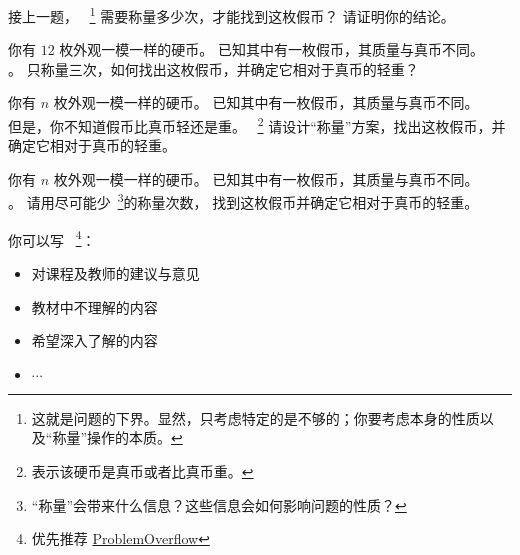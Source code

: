 \documentclass[a4paper, justified]{tufte-handout}
\begin{document}
\begin{solution}
\end{solution}

\begin{problem}[$n$ 枚硬币问题的下界]
  接上一题，
  ~\footnote{这就是问题的下界。显然，只考虑特定的是不够的；你要考虑本身的性质以及``称量''操作的本质。}
  需要称量多少次，才能找到这枚假币？
  请证明你的结论。
\end{problem}

\begin{solution}
\end{solution}

\begin{problem}
  你有 $12$ 枚外观一模一样的硬币。
  已知其中有一枚假币，其质量与真币不同。\\
  。
  只称量三次，如何找出这枚假币，并确定它相对于真币的轻重？

\end{problem}

\begin{solution}%
\end{solution}

\beginoptional

\begin{problem}[$n$ 枚硬币]
  你有 $n$ 枚外观一模一样的硬币。
  已知其中有一枚假币，其质量与真币不同。\\
  但是，你不知道假币比真币轻还是重。
  ~\footnote{表示该硬币是真币或者比真币重。} 
  请设计``称量''方案，找出这枚假币，并确定它相对于真币的轻重。
\end{problem}

\begin{solution}
\end{solution}

\beginot

\begin{problem}[$n$ 枚硬币]
  你有 $n$ 枚外观一模一样的硬币。
  已知其中有一枚假币，其质量与真币不同。\\
  。
  请用尽可能少~\footnote{``称量''会带来什么信息？这些信息会如何影响问题的性质？}的称量次数，
  找到这枚假币并确定它相对于真币的轻重。
\end{problem}

\begin{solution}
\end{solution}

\beginfb

你可以写
~\footnote{优先推荐 \href{http://39.100.120.199}{ProblemOverflow}}：
\begin{itemize}
  \item 对课程及教师的建议与意见
  \item 教材中不理解的内容
  \item 希望深入了解的内容
  \item $\cdots$
\end{itemize}
\end{document}
